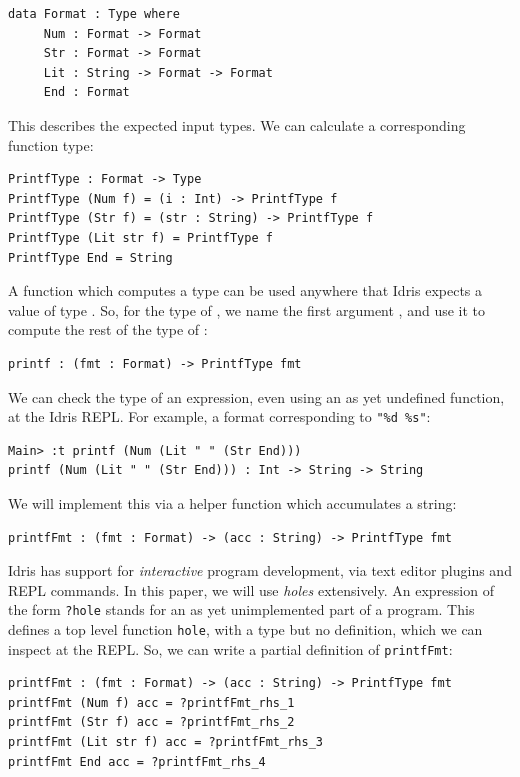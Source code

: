 \begin{lstlisting}
data Format : Type where
     Num : Format -> Format
     Str : Format -> Format
     Lit : String -> Format -> Format
     End : Format
\end{lstlisting}

This describes the expected input types. We can calculate
a corresponding function type:
  
\begin{lstlisting}
PrintfType : Format -> Type
PrintfType (Num f) = (i : Int) -> PrintfType f
PrintfType (Str f) = (str : String) -> PrintfType f
PrintfType (Lit str f) = PrintfType f
PrintfType End = String
\end{lstlisting}

A function which computes a type can be used anywhere that Idris expects a
value of type . So, for the type of , we name the first
argument , and use it to compute the rest of the type of :

\begin{lstlisting}
printf : (fmt : Format) -> PrintfType fmt
\end{lstlisting}

We can check the type of an expression, even using an as yet undefined function,
at the Idris REPL. For example, a format corresponding to \texttt{"\%d \%s"}:

\begin{lstlisting}
Main> :t printf (Num (Lit " " (Str End)))
printf (Num (Lit " " (Str End))) : Int -> String -> String
\end{lstlisting}

We will implement this via a helper function which accumulates a string:

\begin{lstlisting}
printfFmt : (fmt : Format) -> (acc : String) -> PrintfType fmt
\end{lstlisting}

Idris has support
for \emph{interactive} program development, via text editor plugins and REPL
commands. In this paper, we will use \emph{holes} extensively.
An expression of the form \texttt{?hole} stands for an as yet unimplemented
part of a program. This defines a top level function \texttt{hole}, with a type
but no definition, which we can inspect at the REPL. So, we can write a partial
definition of \texttt{printfFmt}:

\begin{lstlisting}
printfFmt : (fmt : Format) -> (acc : String) -> PrintfType fmt
printfFmt (Num f) acc = ?printfFmt_rhs_1
printfFmt (Str f) acc = ?printfFmt_rhs_2
printfFmt (Lit str f) acc = ?printfFmt_rhs_3
printfFmt End acc = ?printfFmt_rhs_4
\end{lstlisting}

